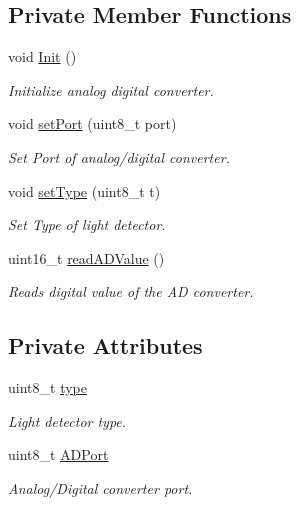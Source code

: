 \subsection*{Private Member Functions}
\begin{DoxyCompactItemize}
\item 
void \hyperlink{classPhotoresistor_afe829b4b1be3d742d789ab6b75dc0c9d}{Init} ()
\begin{DoxyCompactList}\small\item\em Initialize analog digital converter. \end{DoxyCompactList}\item 
void \hyperlink{classPhotoresistor_a984cf8c9ed6a428f5b025a5ea85822da}{set\+Port} (uint8\+\_\+t port)
\begin{DoxyCompactList}\small\item\em Set Port of analog/digital converter. \end{DoxyCompactList}\item 
void \hyperlink{classPhotoresistor_a5c3bc9e8877b54faeded1450a39552fb}{set\+Type} (uint8\+\_\+t t)
\begin{DoxyCompactList}\small\item\em Set Type of light detector. \end{DoxyCompactList}\item 
uint16\+\_\+t \hyperlink{classPhotoresistor_aea81da3cce831497e50b02344bbba238}{read\+A\+D\+Value} ()
\begin{DoxyCompactList}\small\item\em Reads digital value of the AD converter. \end{DoxyCompactList}\end{DoxyCompactItemize}
\subsection*{Private Attributes}
\begin{DoxyCompactItemize}
\item 
uint8\+\_\+t \hyperlink{classPhotoresistor_a0edaea79b0038417748c103f3647bd7d}{type}
\begin{DoxyCompactList}\small\item\em Light detector type. \end{DoxyCompactList}\item 
uint8\+\_\+t \hyperlink{classPhotoresistor_a550c85d1df00f323cd2fb86bb3d73c15}{A\+D\+Port}
\begin{DoxyCompactList}\small\item\em Analog/\+Digital converter port. \end{DoxyCompactList}\end{DoxyCompactItemize}


